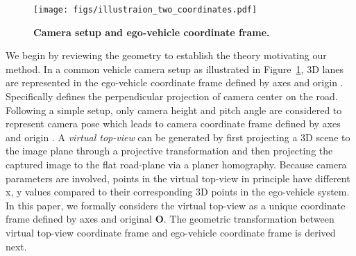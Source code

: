 \documentclass[10pt,twocolumn,letterpaper]{article}
\begin{document}
\begin{comment}
Suppose a 3D point  from ego-vehicle coordinate frame is projected to a 2D image point  through a projective transformation, its corresponding 2D point  from top-view coordinate frame is projected to the same 2D image point through a planar homography. Given camera orientation represented by rotation matrix , translation , and intrinsic matrix , such relationship can be explicitly written in the following equation: 
{\small

}
\noindent where  indicates the first two columns of , and ,  indicate scale factors. At the first glance, direct deriving the transformation between  and  might be algebraically complicated, which may also require to break down the rotation matrix explicitly. However, deriving from a geometric perspective is far simpler than from a algebraic perspective. \end{comment}
\begin{figure}[!h]
  \centering
  \texttt{[image: figs/illustraion\_two\_coordinates.pdf]}
\caption{\textbf{Camera setup and ego-vehicle coordinate frame.}} \label{fig:coord:sys}
\end{figure}



We begin by reviewing the geometry to establish the theory motivating our method. In a common vehicle camera setup as illustrated in Figure~\ref{fig:coord:sys},
3D lanes are represented in the ego-vehicle coordinate frame defined by  axes and origin . Specifically  defines the perpendicular projection of camera center on the road. Following a simple setup, only camera height  and pitch angle  are considered to represent camera pose which leads to camera coordinate frame defined by  axes and origin . 
A \textit{virtual top-view} can be generated by first projecting a 3D scene to the image plane through a projective transformation and then projecting the captured image to the flat road-plane via a planer homography. Because camera parameters are involved, points in the virtual top-view in principle have different x, y values compared to their corresponding 3D points in the ego-vehicle system. In this paper, we formally considers the virtual top-view as a unique coordinate frame defined by axes  and original \textbf{O}. The geometric transformation between virtual top-view coordinate frame and ego-vehicle coordinate frame is derived next.
\end{document}
